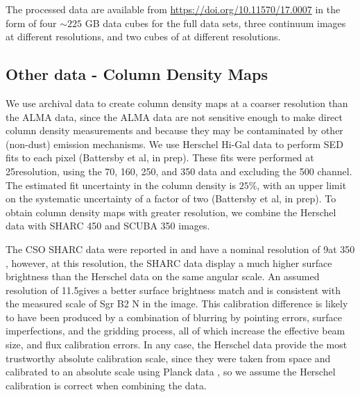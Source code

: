 \documentclass[twocolumn]{aastex61}
\begin{document}
The processed data are available from \url{https://doi.org/10.11570/17.0007} in
the form of four $\sim225$ GB data cubes for the full data sets, three
continuum images at different resolutions, and two cubes of \cyanoacetylene at
different resolutions. 

\subsection{Other data - Column Density Maps}
\label{sec:colmaps}
We use archival data to create column density maps at a coarser
resolution than the ALMA data, since the ALMA data are not sensitive
enough to make direct column density measurements and because they
may be contaminated by other (non-dust) emission mechanisms.   We use Herschel
Hi-Gal data \citep{Molinari2010a} to perform SED fits to each pixel (Battersby
et al, in prep).  These fits were performed at 25\arcsec resolution, using the
70, 160, 250, and 350 \um data and excluding the 500 \um channel.  The
estimated fit uncertainty in the column density is $25\%$, with an upper limit
on the systematic uncertainty of a factor of two (Battersby et al, in prep).
To obtain column density maps with greater resolution, we combine the Herschel
data with SHARC 450 \um and
SCUBA 350 \um images.


The CSO SHARC data were reported in \citet{Bally2010a} and have a nominal
resolution of 9\arcsec at 350 \um, however, at this resolution, the SHARC data
display a much higher surface brightness than the Herschel data on the same
angular scale.  An assumed resolution of 11.5\arcsec gives a better surface
brightness match and is consistent with the measured scale of Sgr B2 N in the
image.  This calibration difference is likely to have been produced by a
combination of blurring by pointing errors, surface imperfections, and the
gridding process, all of which increase the effective beam size, and flux
calibration errors.  In any case, the Herschel data provide the most
trustworthy absolute calibration scale, since they were taken from space and
calibrated to an absolute scale using Planck data
\citep{Bendo2013a,Bertincourt2016a}, so we assume the Herschel calibration is
correct when combining the data.
\end{document}
